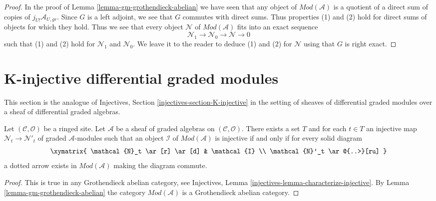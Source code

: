 \begin{proof}
\medskip\noindent
In the proof of Lemma \ref{lemma-gm-grothendieck-abelian}
we have seen that any object
of $\textit{Mod}(\mathcal{A})$ is a quotient of a direct sum
of copies of $j_{U!}\mathcal{A}_{U, gr}$. Since $G$ is a left
adjoint, we see that $G$ commutes with direct sums. Thus
properties (1) and (2) hold for direct sums of objects
for which they hold. Thus we see that every object $\mathcal{N}$
of $\textit{Mod}(\mathcal{A})$ fits into an exact sequence
$$
\mathcal{N}_1 \to \mathcal{N}_0 \to \mathcal{N} \to 0
$$
such that (1) and (2) hold for $\mathcal{N}_1$ and $\mathcal{N}_0$.
We leave it to the reader to deduce (1) and (2) for
$\mathcal{N}$ using that $G$ is right exact.
\end{proof}









\section{K-injective differential graded modules}
\label{section-K-injective}

\noindent
This section is the analogue of
Injectives, Section \ref{injectives-section-K-injective}
in the setting of sheaves of differential graded modules
over a sheaf of differential graded algebras.

\begin{lemma}
\label{lemma-characterize-injectives}
Let $(\mathcal{C}, \mathcal{O})$ be a ringed site. Let $\mathcal{A}$
be a sheaf of graded algebras on $(\mathcal{C}, \mathcal{O})$.
There exists a set $T$ and for each $t \in T$ an injective map
$\mathcal{N}_t \to \mathcal{N}'_t$ of graded $\mathcal{A}$-modules
such that an object $\mathcal{I}$ of $\textit{Mod}(\mathcal{A})$
is injective if and only if for every solid diagram
$$
\xymatrix{
\mathcal{N}_t \ar[r] \ar[d] & \mathcal{I} \\
\mathcal{N}'_t \ar@{..>}[ru]
}
$$
a dotted arrow exists in $\textit{Mod}(\mathcal{A})$ making the diagram commute.
\end{lemma}

\begin{proof}
This is true in any Grothendieck abelian category, see
Injectives, Lemma \ref{injectives-lemma-characterize-injective}.
By Lemma \ref{lemma-gm-grothendieck-abelian} the category
$\textit{Mod}(\mathcal{A})$ is a Grothendieck abelian category.
\end{proof}


